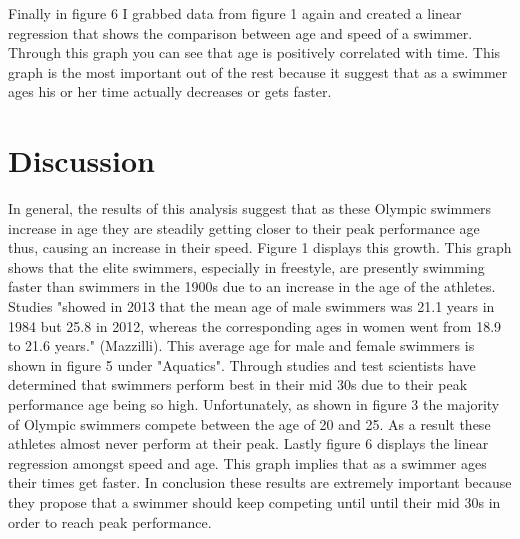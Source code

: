 \documentclass[letterpaper, 10 pt, conference]{ieeeconf}  %
\begin{document}

Finally in figure 6 I grabbed data from figure 1 again and created a linear regression that shows the comparison between age and speed of a swimmer. Through this graph you can see that age is positively correlated with time. This graph is the most important out of the rest because it suggest that as a swimmer ages his or her time actually decreases or gets faster. 


\section{Discussion}
In general, the results of this analysis suggest that as these Olympic swimmers increase in age they are steadily getting closer to their peak performance age thus, causing an increase in their speed. Figure 1 displays this growth. This graph shows that the elite swimmers, especially in freestyle, are presently swimming faster than swimmers in the 1900s due to an increase in the age of the athletes. Studies "showed in 2013 that the mean age of male swimmers was 21.1 years in 1984 but 25.8 in 2012, whereas the corresponding ages in women went from 18.9 to 21.6 years." (Mazzilli). This average age for male and female swimmers is shown in figure 5 under "Aquatics". Through studies and test scientists have determined that swimmers perform best in their mid 30s due to their peak performance age being so high. Unfortunately, as shown in figure 3 the majority of Olympic swimmers compete between the age of 20 and 25. As a result these athletes almost never perform at their peak. Lastly figure 6 displays the linear regression amongst speed and age. This graph implies that as a swimmer ages their times get faster. In conclusion these results are extremely important because they propose that a swimmer should keep competing until until their mid 30s in order to reach peak performance. 
\end{document}

